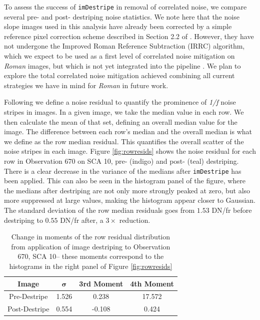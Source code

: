 \documentclass[]{pasj01}
\begin{document}
To assess the success of \texttt{imDestripe} in removal of correlated noise, we compare several pre- and post- destriping noise statistics. We note here that the noise slope images used in this analysis have already been corrected by a simple reference pixel correction scheme described in Section 2.2 of \citet{Laliotis2024}. However, they have not undergone the Improved Roman Reference Subtraction (IRRC) algorithm, which we expect to be used as a first level of correlated noise mitigation on \textit{Roman} images, but which is not yet integrated into the pipeline \citep{Betti2024}. We plan to explore the total correlated noise mitigation achieved combining all current strategies we have in mind for \textit{Roman} in future work.


Following \citet{Rauscher2022} we define a noise residual to quantify the prominence of \textit{1/f} noise stripes in images. In a given image, we take the median value in each row. We then calculate the mean of that set, defining an overall median value for the image. The difference between each row's median and the overall median is what we define as the row median residual. This quantifies the overall scatter of the noise stripes in each image. Figure \ref{fig:rowresids} shows the noise residual for each row in Observation 670 on SCA 10, pre- (indigo) and post- (teal) destriping. There is a clear decrease in the variance of the medians after \texttt{imDestripe} has been applied. This can also be seen in the histogram panel of the figure, where the medians after destriping are not only more strongly peaked at zero, but also more suppressed at large values, making the histogram appear closer to Gaussian. The standard deviation of the row median residuals goes from $1.53$ DN/fr before destriping to $0.55$ DN/fr after, a $3\times$ reduction.

\begin{table}[]
    \centering
    \begin{tabular}{c|c|c|c}
         \textbf{Image} & $\boldsymbol{\sigma}$ & \textbf{3rd Moment} & \textbf{4th Moment} \\
         \hline\hline
        Pre-Destripe & 1.526 & 0.238 & 17.572 \\
        Post-Destripe & 0.554 & -0.108 & 0.424 \\
    \end{tabular}
    \caption{Change in moments of the row residual distribution from application of image destriping to Observation 670, SCA 10-- these moments correspond to the histograms in the right panel of Figure \ref{fig:rowresids}}
    \label{tab:distributions}
\end{table}
\end{document}
